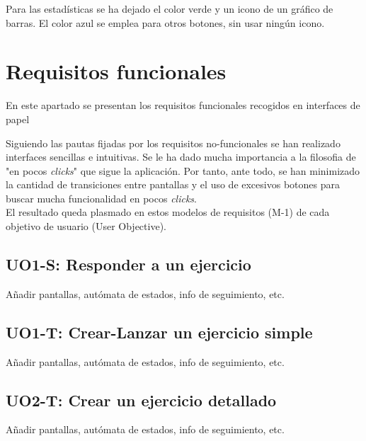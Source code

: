 Para las estadísticas se ha dejado el color verde y un icono de un gráfico de barras. El color azul se emplea para otros botones, sin usar ningún icono.\\

\section{Requisitos funcionales}
\label{analisis-de-requisitos:funcionales}

En este apartado se presentan los requisitos funcionales recogidos en interfaces de papel

Siguiendo las pautas fijadas por los requisitos no-funcionales se han realizado interfaces sencillas e intuitivas. Se le ha dado mucha importancia a la filosofia de "en pocos \textit{clicks}" que sigue la aplicación. Por tanto, ante todo, se han minimizado la cantidad de transiciones entre pantallas y el uso de excesivos botones para buscar mucha funcionalidad en pocos \textit{clicks}.\\

El resultado queda plasmado en estos modelos de requisitos (M-1) de cada objetivo de usuario (User Objective).\\

\subsection{UO1-S: Responder a un ejercicio}
\label{analisis-de-requisitos:funcionales:uo1s}

Añadir pantallas, autómata de estados, info de seguimiento, etc.\\

\subsection{UO1-T: Crear-Lanzar un ejercicio simple}
\label{analisis-de-requisitos:funcionales:uo1t}

Añadir pantallas, autómata de estados, info de seguimiento, etc.\\

\subsection{UO2-T: Crear un ejercicio detallado}
\label{analisis-de-requisitos:funcionales:uo2t}

Añadir pantallas, autómata de estados, info de seguimiento, etc.\\

